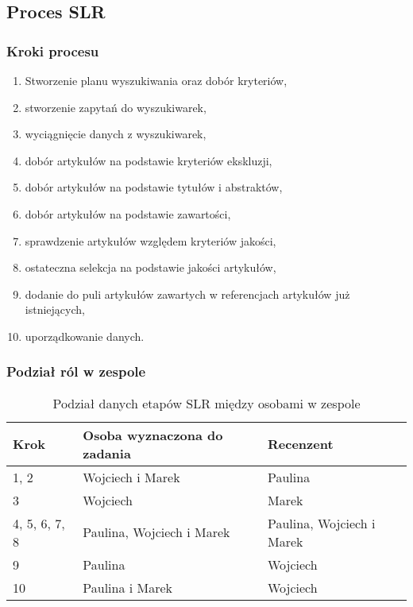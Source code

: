 \documentclass[polish,envcountsect,10pt]{article}
\begin{document}
\subsection{Proces SLR}

\subsubsection{Kroki procesu}

\begin{enumerate}
	\item Stworzenie planu wyszukiwania oraz dobór kryteriów,
	\item stworzenie zapytań do wyszukiwarek,
	\item wyciągnięcie danych z wyszukiwarek,
	\item dobór artykułów na podstawie kryteriów ekskluzji,
	\item dobór artykułów na podstawie tytułów i abstraktów,
	\item dobór artykułów na podstawie zawartości,
	\item sprawdzenie artykułów względem kryteriów jakości,
	\item ostateczna selekcja na podstawie jakości artykułów,
	\item dodanie do puli artykułów zawartych w referencjach artykułów już istniejących,
	\item uporządkowanie danych.
\end{enumerate}

\subsubsection{Podział ról w zespole}

\begin{table}[H]
	\caption{Podział danych etapów SLR między osobami w zespole}
	\centering
	\begin{tabular}{|p{1.7cm}|p{5cm}|p{5cm}|}
		\hline
		Krok          & Osoba wyznaczona do zadania & Recenzent                 \\
		\hline
		1, 2          & Wojciech i Marek            & Paulina                   \\
		\hline
		3             & Wojciech                    & Marek                     \\
		\hline
		4, 5, 6, 7, 8 & Paulina, Wojciech i Marek   & Paulina, Wojciech i Marek \\
		\hline
		9             & Paulina                     & Wojciech                  \\
		\hline
		10            & Paulina i Marek             & Wojciech                  \\
		\hline
	\end{tabular}
\end{table}
\end{document}
